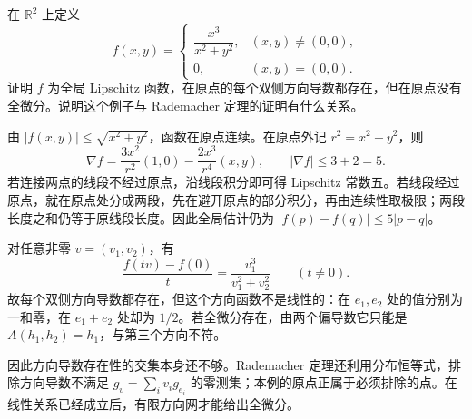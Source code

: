 \begin{exercise}\label{g3:ex:directional-not-total-differential}
	在 \(\mathbb R^2\) 上定义
	\[
		f(x,y)=
		\begin{cases}
			\dfrac{x^3}{x^2+y^2},&(x,y)\ne(0,0),\\[4pt]
			0,&(x,y)=(0,0).
		\end{cases}
	\]
	证明 \(f\) 为全局 Lipschitz 函数，在原点的每个双侧方向导数都存在，但在原点没有全微分。说明这个例子与 Rademacher 定理的证明有什么关系。
\end{exercise}
\begin{solution}
	由 \(|f(x,y)|\le\sqrt{x^2+y^2}\)，函数在原点连续。在原点外记 \(r^2=x^2+y^2\)，则
	\[
		\nabla f=\frac{3x^2}{r^2}(1,0)
		-\frac{2x^3}{r^4}(x,y),
		\qquad |\nabla f|\le3+2=5.
	\]
	若连接两点的线段不经过原点，沿线段积分即可得 Lipschitz 常数五。若线段经过原点，就在原点处分成两段，先在避开原点的部分积分，再由连续性取极限；两段长度之和仍等于原线段长度。因此全局估计仍为 \(|f(p)-f(q)|\le5|p-q|\)。

	对任意非零 \(v=(v_1,v_2)\)，有
	\[
		\frac{f(tv)-f(0)}t=\frac{v_1^3}{v_1^2+v_2^2}
		\qquad(t\ne0).
	\]
	故每个双侧方向导数都存在，但这个方向函数不是线性的：在 \(e_1,e_2\) 处的值分别为一和零，在 \(e_1+e_2\) 处却为 \(1/2\)。若全微分存在，由两个偏导数它只能是 \(A(h_1,h_2)=h_1\)，与第三个方向不符。

	因此方向导数存在性的交集本身还不够。Rademacher 定理还利用分布恒等式，排除方向导数不满足 \(g_v=\sum_i v_i g_{e_i}\) 的零测集；本例的原点正属于必须排除的点。在线性关系已经成立后，有限方向网才能给出全微分。
\end{solution}

